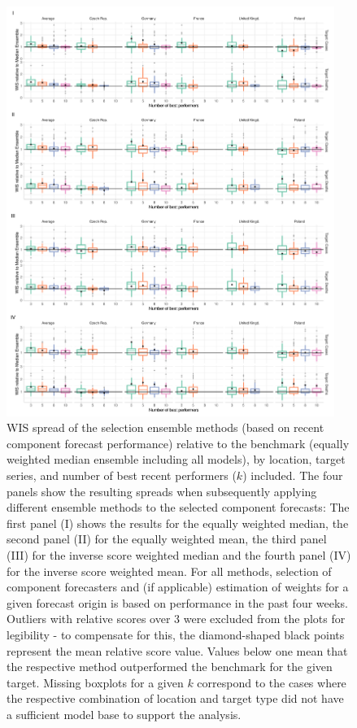 \begin{figure}
\centering
\includegraphics[width = 0.95\textwidth]{../plots/best_performers_boxplot}
\caption{\footnotesize{WIS spread of the selection ensemble methods (based on recent component forecast performance) relative to the benchmark (equally weighted median ensemble including all models), by location, target series, and number of best recent performers ($k$) included. The four panels show the resulting spreads when subsequently applying different ensemble methods to the selected component forecasts: The first panel (I) shows the results for the equally weighted median, the second panel (II) for the equally weighted mean, the third panel (III) for the inverse score weighted median and the fourth panel (IV) for the inverse score weighted mean. For all methods, selection of component forecasters and (if applicable) estimation of weights for a given forecast origin is based on performance in the past four weeks. Outliers with relative scores over 3 were excluded from the plots for legibility - to compensate for this, the diamond-shaped black points represent the mean relative score value. Values below one mean that the respective method outperformed the benchmark for the given target. Missing boxplots for a given $k$ correspond to the cases where the respective combination of location and target type did not have a sufficient model base to support the analysis.}}
\label{ref:best_perform_boxplot}
\end{figure}\\
